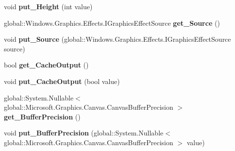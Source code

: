 \begin{DoxyCompactItemize}
void {\bfseries put\+\_\+\+Height} (int value)
\item 
\mbox{\label{class_microsoft_1_1_graphics_1_1_canvas_1_1_effects_1_1_morphology_effect_a3a2a845c602a6a0210a1eec2fde425ce}} 
global\+::\+Windows.\+Graphics.\+Effects.\+I\+Graphics\+Effect\+Source {\bfseries get\+\_\+\+Source} ()
\item 
\mbox{\label{class_microsoft_1_1_graphics_1_1_canvas_1_1_effects_1_1_morphology_effect_ae949c76c82e06342011eb1752f181098}} 
void {\bfseries put\+\_\+\+Source} (global\+::\+Windows.\+Graphics.\+Effects.\+I\+Graphics\+Effect\+Source source)
\item 
\mbox{\label{class_microsoft_1_1_graphics_1_1_canvas_1_1_effects_1_1_morphology_effect_a77f71f5925758effa265f4eeeb2f6f4a}} 
bool {\bfseries get\+\_\+\+Cache\+Output} ()
\item 
\mbox{\label{class_microsoft_1_1_graphics_1_1_canvas_1_1_effects_1_1_morphology_effect_ad7cedb874a08fef65c195124455c9138}} 
void {\bfseries put\+\_\+\+Cache\+Output} (bool value)
\item 
\mbox{\label{class_microsoft_1_1_graphics_1_1_canvas_1_1_effects_1_1_morphology_effect_a35ea5c10eb956a33432ecf7e5554f786}} 
global\+::\+System.\+Nullable$<$ global\+::\+Microsoft.\+Graphics.\+Canvas.\+Canvas\+Buffer\+Precision $>$ {\bfseries get\+\_\+\+Buffer\+Precision} ()
\item 
\mbox{\label{class_microsoft_1_1_graphics_1_1_canvas_1_1_effects_1_1_morphology_effect_a80843c3d8798e8c47951e2a54b322621}} 
void {\bfseries put\+\_\+\+Buffer\+Precision} (global\+::\+System.\+Nullable$<$ global\+::\+Microsoft.\+Graphics.\+Canvas.\+Canvas\+Buffer\+Precision $>$ value)
\item 
\mbox{\label{class_microsoft_1_1_graphics_1_1_canvas_1_1_effects_1_1_morphology_effect_a18be064d6fd36e853847ee82d737edec}} 

\end{DoxyCompactItemize}
